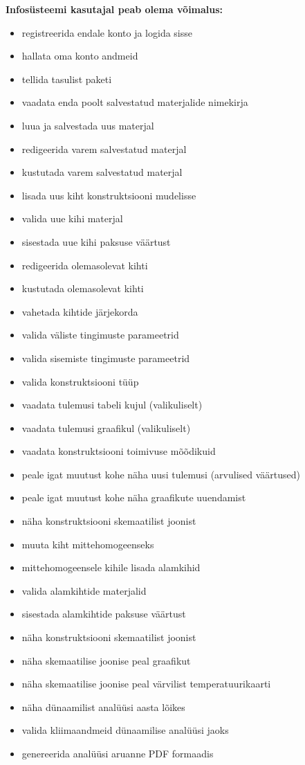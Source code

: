 \textbf{Infosüsteemi kasutajal peab olema võimalus:}
\begin{itemize}
    \item registreerida endale konto ja logida sisse
    \item hallata oma konto andmeid
    \item tellida tasulist paketi
    \item vaadata enda poolt salvestatud materjalide nimekirja
    \item luua ja salvestada uus materjal
    \item redigeerida varem salvestatud materjal
    \item kustutada varem salvestatud materjal
    \item lisada uus kiht konstruktsiooni mudelisse
    \item valida uue kihi materjal
    \item sisestada uue kihi paksuse väärtust
    \item redigeerida olemasolevat kihti
    \item kustutada olemasolevat kihti
    \item vahetada kihtide järjekorda
    \item valida väliste tingimuste parameetrid
    \item valida sisemiste tingimuste parameetrid
    \item valida konstruktsiooni tüüp
    \item vaadata tulemusi tabeli kujul (valikuliselt)
    \item vaadata tulemusi graafikul (valikuliselt)
    \item vaadata konstruktsiooni toimivuse mõõdikuid
    \item peale igat muutust kohe näha uusi tulemusi (arvulised väärtused)
    \item peale igat muutust kohe näha graafikute uuendamist
    \item näha konstruktsiooni skemaatilist joonist
    \item muuta kiht mittehomogeenseks
    \item mittehomogeensele kihile lisada alamkihid
    \item valida alamkihtide materjalid
    \item sisestada alamkihtide paksuse väärtust
    \item näha konstruktsiooni skemaatilist joonist
    \item näha skemaatilise joonise peal graafikut
    \item näha skemaatilise joonise peal värvilist temperatuurikaarti
    \item näha dünaamilist analüüsi aasta lõikes
    \item valida kliimaandmeid dünaamilise analüüsi jaoks
    \item genereerida analüüsi aruanne PDF formaadis
\end{itemize}

